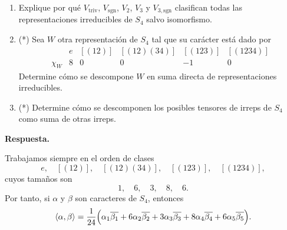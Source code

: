 \documentclass[10pt,a4paper]{article}
\newcommand{\inlinehead}[2][repblue]{%
  \par\smallskip
  {\color{#1}\bfseries #2.}\hspace{0.45em}%
}
\newcommand{\answer}{\inlinehead{Respuesta}}
\begin{document}
{\begin{enumerate}[label=(\alph*),leftmargin=2.4em]
\item Explique por qué $V_{\mathrm{triv}}$, $V_{\mathrm{sgn}}$, $V_2$, $V_3$ y
$V_{3,\mathrm{sgn}}$ clasifican todas las representaciones irreducibles de $S_4$ salvo
isomorfismo.

\item (*) Sea $W$ otra representación de $S_4$ tal que su carácter está dado por
\[
  \begin{array}{c|ccccc}
    & e & [(12)] & [(12)(34)] & [(123)] & [(1234)] \\
    \chi_W & 8 & 0 & 0 & -1 & 0
  \end{array}
\]
Determine cómo se descompone $W$ en suma directa de representaciones irreducibles.

\item (*) Determine cómo se descomponen los posibles tensores de irreps de $S_4$ como suma
de otras irreps.
\end{enumerate}
}

\answer
Trabajamos siempre en el orden de clases
\[
  e,\quad [(12)],\quad [(12)(34)],\quad [(123)],\quad [(1234)],
\]
cuyos tamaños son
\[
  1,\quad 6,\quad 3,\quad 8,\quad 6.
\]
Por tanto, si $\alpha$ y $\beta$ son caracteres de $S_4$, entonces
\[
  \langle \alpha,\beta\rangle
  =\frac{1}{24}\Bigl(
    \alpha_1\overline{\beta_1}
    +6\alpha_2\overline{\beta_2}
    +3\alpha_3\overline{\beta_3}
    +8\alpha_4\overline{\beta_4}
    +6\alpha_5\overline{\beta_5}
  \Bigr).
\]
\end{document}
